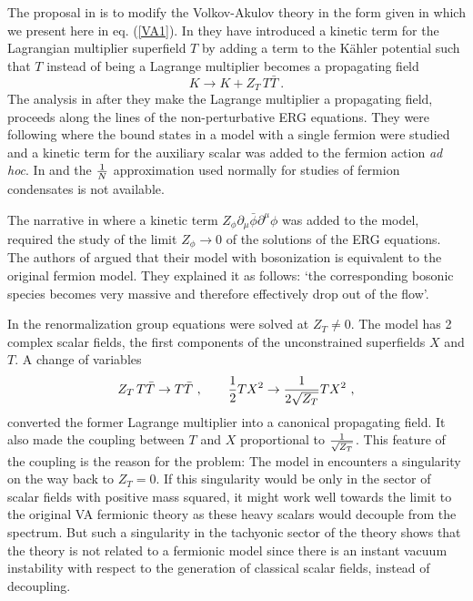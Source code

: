 \documentclass[11pt]{article}
\newcommand{\be}{\begin{equation}}
\newcommand{\ee}{\end{equation}}
\def\K{K{\"a}hler }
\newcommand{\rf}[1]{(\ref{#1})}
\def\be{\begin{equation}}
\def\ee{\end{equation}}
\begin{document}
The proposal in \cite{DallAgata:2022abm} is to modify the Volkov-Akulov theory \cite{Volkov:1973ix} in the form given in \cite{Komargodski:2009rz} which we present here in eq. \rf{VA1}. In \cite{DallAgata:2022abm} they have introduced a kinetic term for the Lagrangian multiplier   superfield $T$ by adding a term to the \K potential such that $T$ instead of being a Lagrange multiplier becomes a propagating field
\be
K \rightarrow K +Z_T \, T\bar T    \ .
\ee
The analysis in  \cite{DallAgata:2022abm}  after they make the Lagrange multiplier a propagating field, proceeds along the lines of the non-perturbative ERG equations. They were following \cite{Jaeckel:2002rm}  where the bound states in a model with a single fermion were studied  and a kinetic term for the  auxiliary scalar was added to the fermion action {\it ad hoc}. In  \cite{Jaeckel:2002rm} and \cite{DallAgata:2022abm} the ${1\over N}$ approximation used normally for studies of fermion condensates is not available.

The narrative in \cite{Jaeckel:2002rm} where a kinetic term $Z_\phi \partial_\mu \bar \phi \partial^\mu  \phi $ was added to the model, required the study of the limit $Z_\phi \rightarrow 0 $ of the solutions of the ERG equations. The authors of  \cite{Jaeckel:2002rm, Braun:2011pp}  argued that their model with  bosonization is equivalent to the original fermion model. They explained it as follows:  
`the corresponding bosonic species becomes very massive and therefore effectively drop out of the flow'.

In \cite{DallAgata:2022abm} the renormalization group equations were solved at   $Z_T \not = 0$. The model has 2 complex scalar fields, the first components of the unconstrained superfields $X$ and $T$. A change of variables 
\be
Z_T\, T \bar T\rightarrow   T { \bar T} \ , \qquad {1\over 2}TX^2  \rightarrow   {1\over 2 \sqrt {Z_T} }TX^2 \ ,
\ee
converted the former Lagrange multiplier into a canonical propagating field.  It also made the coupling between $T$ and $X$ proportional to $ {1\over  \sqrt {Z_T} }$. This feature of the coupling is the reason for the problem: The model in \cite{DallAgata:2022abm} encounters a singularity on the way  back to $Z_T=0$. If this singularity would be only in the sector of scalar fields with positive mass squared, it might work well towards the limit to the original VA  fermionic theory as these heavy scalars would decouple from the spectrum. But such a singularity  in the tachyonic sector of the theory shows that the theory is not related to a fermionic model since there is an instant vacuum instability with respect to the generation of classical scalar fields, instead of decoupling.
\end{document}
